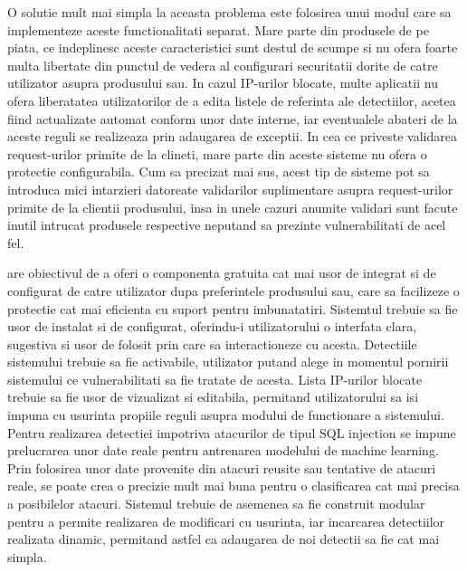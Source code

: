 O solutie mult mai simpla la aceasta problema este folosirea unui modul care sa implementeze aceste functionalitati separat. Mare parte din produsele de pe piata, ce indeplinesc aceste caracteristici sunt destul de scumpe si nu ofera foarte multa libertate din punctul de vedera al configurari securitatii dorite de catre utilizator asupra produsului sau. In cazul IP-urilor blocate, multe aplicatii nu ofera liberatatea utilizatorilor de a edita listele de referinta ale detectiilor, acetea fiind actualizate automat conform unor date interne, iar eventualele abateri de la aceste reguli se realizeaza prin adaugarea de exceptii. In cea ce priveste validarea request-urilor primite de la clineti, mare parte din aceste sisteme nu ofera o protectie configurabila. Cum sa precizat mai sus, acest tip de sisteme pot sa introduca mici intarzieri datoreate validarilor suplimentare asupra request-urilor primite de la clientii produsului, insa in unele cazuri anumite validari sunt facute inutil intrucat produsele respective neputand sa prezinte vulnerabilitati de acel fel.

 \textit{\thesistitle} are obiectivul de a oferi o componenta gratuita cat mai usor de integrat si de configurat de catre utilizator dupa preferintele produsului sau, care sa facilizeze o protectie cat mai eficienta cu suport pentru imbunatatiri. Sistemtul trebuie sa fie usor de instalat si de configurat, oferindu-i utilizatorului o interfata clara, sugestiva si usor de folosit prin care sa interactioneze cu acesta. Detectiile sistemului trebuie sa fie activabile, utilizator putand alege in momentul  pornirii sistemului ce vulnerabilitati sa fie tratate de acesta. Lista IP-urilor blocate trebuie sa fie usor de vizualizat si editabila, permitand utilizatorului sa isi impuna cu usurinta propiile reguli asupra modului de functionare a sistemului. Pentru realizarea detectiei impotriva atacurilor de tipul SQL injection se impune prelucrarea unor date reale pentru antrenarea modelului de machine learning. Prin folosirea unor date provenite din atacuri reusite sau tentative de atacuri reale, se poate crea o precizie mult mai buna pentru o clasificarea cat mai precisa a posibilelor atacuri. Sistemul trebuie de asemenea sa fie construit modular pentru a permite realizarea de modificari cu usurinta, iar incarcarea detectiilor realizata dinamic, permitand astfel ca adaugarea de noi detectii sa fie cat mai simpla.




